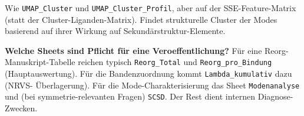 \documentclass[11pt,a4paper,twoside]{article}
\theoremstyle{remark}
\begin{document}
Wie \texttt{UMAP\_Cluster} und \texttt{UMAP\_Cluster\_Profil}, aber
auf der SSE-Feature-Matrix (statt der Cluster-Liganden-Matrix). Findet
strukturelle Cluster der Modes basierend auf ihrer Wirkung auf
Sekund\"arstruktur-Elemente.

\begin{infobox}
\textbf{Welche Sheets sind Pflicht f\"ur eine Veroeffentlichung?}
F\"ur eine Reorg-Manuskript-Tabelle reichen typisch \texttt{Reorg\_Total}
und \texttt{Reorg\_pro\_Bindung} (Hauptauswertung). F\"ur die
Bandenzuordnung kommt \texttt{Lambda\_kumulativ} dazu (NRVS-
\"Uberlagerung). F\"ur die Mode-Charakterisierung das Sheet
\texttt{Modenanalyse} und (bei symmetrie-relevanten Fragen)
\texttt{SCSD}. Der Rest dient internen Diagnose-Zwecken.
\end{infobox}


\end{document}
